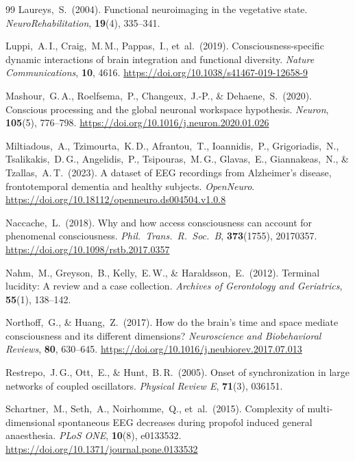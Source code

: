 \documentclass[11pt,a4paper]{article}
\theoremstyle{plain}
\theoremstyle{definition}
\theoremstyle{remark}
\begin{document}
\begin{thebibliography}{99}
Laureys,~S.\ (2004).
Functional neuroimaging in the vegetative state.
\textit{NeuroRehabilitation}, \textbf{19}(4), 335--341.

Luppi,~A.\,I., Craig,~M.\,M., Pappas,~I., et~al.\ (2019).
Consciousness-specific dynamic interactions of brain integration and functional diversity.
\textit{Nature Communications}, \textbf{10}, 4616.
\url{https://doi.org/10.1038/s41467-019-12658-9}

Mashour,~G.\,A., Roelfsema,~P., Changeux,~J.-P., \& Dehaene,~S.\ (2020).
Conscious processing and the global neuronal workspace hypothesis.
\textit{Neuron}, \textbf{105}(5), 776--798.
\url{https://doi.org/10.1016/j.neuron.2020.01.026}

Miltiadous,~A., Tzimourta,~K.\,D., Afrantou,~T., Ioannidis,~P., Grigoriadis,~N., Tsalikakis,~D.\,G., Angelidis,~P., Tsipouras,~M.\,G., Glavas,~E., Giannakeas,~N., \& Tzallas,~A.\,T.\ (2023).
A dataset of EEG recordings from Alzheimer's disease, frontotemporal dementia and healthy subjects.
\textit{OpenNeuro}.
\url{https://doi.org/10.18112/openneuro.ds004504.v1.0.8}

Naccache,~L.\ (2018).
Why and how access consciousness can account for phenomenal consciousness.
\textit{Phil.\ Trans.\ R.\ Soc.\ B}, \textbf{373}(1755), 20170357.
\url{https://doi.org/10.1098/rstb.2017.0357}

Nahm,~M., Greyson,~B., Kelly,~E.\,W., \& Haraldsson,~E.\ (2012).
Terminal lucidity: A review and a case collection.
\textit{Archives of Gerontology and Geriatrics}, \textbf{55}(1), 138--142.

Northoff,~G., \& Huang,~Z.\ (2017).
How do the brain's time and space mediate consciousness and its different dimensions?
\textit{Neuroscience and Biobehavioral Reviews}, \textbf{80}, 630--645.
\url{https://doi.org/10.1016/j.neubiorev.2017.07.013}

Restrepo,~J.\,G., Ott,~E., \& Hunt,~B.\,R.\ (2005).
Onset of synchronization in large networks of coupled oscillators.
\textit{Physical Review E}, \textbf{71}(3), 036151.

Schartner,~M., Seth,~A., Noirhomme,~Q., et~al.\ (2015).
Complexity of multi-dimensional spontaneous EEG decreases during propofol induced general anaesthesia.
\textit{PLoS ONE}, \textbf{10}(8), e0133532.
\url{https://doi.org/10.1371/journal.pone.0133532}


\end{thebibliography}
\end{document}
